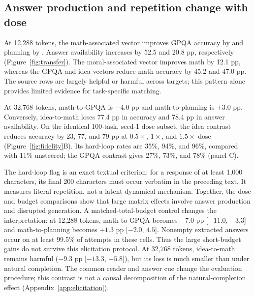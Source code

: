 \subsection{Answer production and repetition change with dose}
At 12,288 tokens, the math-associated vector improves GPQA accuracy by \MathGPQAShort{} and planning by \MathPlanningShort{}. Answer availability increases by 52.5 and 20.8 pp, respectively (Figure~\ref{fig:transfer}). The moral-associated vector improves math by 12.1 pp, whereas the GPQA and idea vectors reduce math accuracy by 45.2 and 47.0 pp. The source rows are largely helpful or harmful across targets; this pattern alone provides limited evidence for task-specific matching.

At 32,768 tokens, math-to-GPQA is $-4.0$ pp and math-to-planning is $+3.0$ pp. Conversely, idea-to-math loses 77.4 pp in accuracy and 78.4 pp in answer availability. On the identical 100-task, seed-1 dose subset, the idea contrast reduces accuracy by 23, 77, and 79 pp at $0.5\times$, $1\times$, and $1.5\times$ dose (Figure~\ref{fig:fidelity}B). Its hard-loop rates are 35\%, 94\%, and 96\%, compared with 11\% unsteered; the GPQA contrast gives 27\%, 73\%, and 78\% (panel C).

The hard-loop flag is an exact textual criterion: for a response of at least 1,000 characters, its final 200 characters must occur verbatim in the preceding text. It measures literal repetition, not a latent dynamical mechanism. Together, the dose and budget comparisons show that large matrix effects involve answer production and disrupted generation. A matched-total-budget control changes the interpretation: at 12,288 tokens, math-to-GPQA becomes $-7.0$ pp [$-11.0$, $-3.3$] and math-to-planning becomes $+1.3$ pp [$-2.0$, $4.5$]. Nonempty extracted answers occur on at least 99.5\% of attempts in these cells. Thus the large short-budget gains do not survive this elicitation protocol. At 32,768 tokens, idea-to-math remains harmful ($-9.3$ pp [$-13.3$, $-5.8$]), but its loss is much smaller than under natural completion. The common reader and answer cue change the evaluation procedure; this contrast is not a causal decomposition of the natural-completion effect (Appendix~\ref{app:elicitation}).

